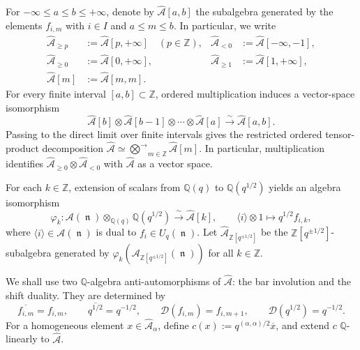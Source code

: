 \documentclass[12pt, reqno]{amsart}
\theoremstyle{plain}
\theoremstyle{definition}
\numberwithin{equation}{section}
\newcommand{\ZZ}{\mathbb{Z}}
\newcommand{\QQ}{\mathbb{Q}}
\newcommand{\fn}{\operatorname{\mathfrak{n}}}
\newcommand{\cA}{\mathcal{A}}
\begin{document}
For \(-\infty\leq a\leq b\leq+\infty\), denote by
\(\widehat{\cA}[a,b]\) the subalgebra generated by the elements
\(f_{i,m}\) with \(i\in I\) and \(a\leq m\leq b\). In particular, we
write
\begin{align*}
    \widehat{\cA}_{\geq p}
    &:=\widehat{\cA}[p,+\infty] \quad(p\in\ZZ),&
    \widehat{\cA}_{<0}
    &:=\widehat{\cA}[-\infty,-1],\\
    \widehat{\cA}_{\geq0}
    &:=\widehat{\cA}[0,+\infty],&
    \widehat{\cA}_{\geq1}
    &:=\widehat{\cA}[1,+\infty],\\
    \widehat{\cA}[m]
    &:=\widehat{\cA}[m,m].&&
\end{align*}
For every finite interval \([a,b]\subset\ZZ\), ordered multiplication
induces a vector-space isomorphism
\begin{equation}\label{eq:ordered-factorization}
    \widehat{\cA}[b]\otimes\widehat{\cA}[b-1]\otimes\cdots
    \otimes\widehat{\cA}[a]
    \xrightarrow{\ \sim\ }
    \widehat{\cA}[a,b].
\end{equation}
Passing to the direct limit over finite intervals gives the restricted
ordered tensor-product decomposition
\(\widehat{\cA}\simeq
\overrightarrow{\bigotimes}_{m\in\ZZ}\widehat{\cA}[m]\). In
particular, multiplication identifies
\(\widehat{\cA}_{\geq0}\otimes\widehat{\cA}_{<0}\) with
\(\widehat{\cA}\) as a vector space.

For each \(k\in\ZZ\), extension of scalars from \(\QQ(q)\) to
\(\QQ(q^{1/2})\) yields an algebra isomorphism
\begin{equation}\label{eq:level-isomorphism}
    \varphi_k\colon
    \cA(\fn)\otimes_{\QQ(q)}\QQ(q^{1/2})
    \xrightarrow{\ \sim\ }
    \widehat{\cA}[k],
    \qquad
    \langle i\rangle\otimes1\longmapsto q^{1/2}f_{i,k},
\end{equation}
where \(\langle i\rangle\in\cA(\fn)\) is dual to
\(f_i\in U_q(\fn)\). Let
\(\widehat{\cA}_{\ZZ[q^{\pm1/2}]}\) be the
\(\ZZ[q^{\pm1/2}]\)-subalgebra generated by
\(\varphi_k(\cA_{\ZZ[q^{\pm1/2}]}(\fn))\) for all \(k\in\ZZ\).

We shall use two \(\QQ\)-algebra anti-automorphisms of
\(\widehat{\cA}\): the bar involution and the shift duality. They are
determined by
\begin{equation*}
    \overline{f_{i,m}}=f_{i,m},\qquad
    \overline{q^{1/2}}=q^{-1/2},\qquad
    \mathcal D(f_{i,m})=f_{i,m+1},\qquad
    \mathcal D(q^{1/2})=q^{-1/2}.
\end{equation*}
For a homogeneous element \(x\in\widehat{\cA}_\alpha\), define
\(c(x):=q^{(\alpha,\alpha)/2}\overline{x}\), and extend \(c\)
\(\QQ\)-linearly to \(\widehat{\cA}\).
\end{document}
